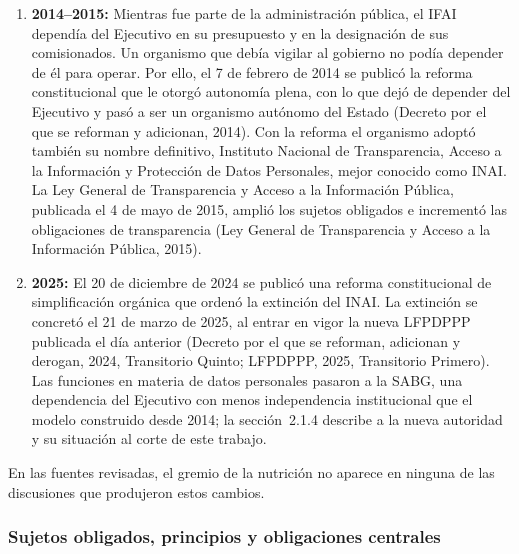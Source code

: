 \documentclass[12pt, a4paper]{article}
\begin{document}
\begin{enumerate}[label=\Roman*.]
  \item \textbf{2014--2015:} Mientras fue parte de la administración
  pública, el IFAI dependía del Ejecutivo en su presupuesto y en la
  designación de sus comisionados. Un organismo que debía vigilar al
  gobierno no podía depender de él para operar. Por ello, el
  7 de febrero de 2014 se publicó la reforma constitucional que le
  otorgó autonomía plena, con lo que dejó de depender del Ejecutivo y
  pasó a ser un organismo autónomo del Estado (Decreto
  por el que se reforman y adicionan, 2014). Con la reforma el
  organismo adoptó también su nombre definitivo, Instituto Nacional
  de Transparencia, Acceso a la Información y Protección de Datos
  Personales, mejor conocido como INAI. La Ley General de Transparencia y Acceso a la Información
  Pública, publicada el 4 de mayo de 2015, amplió los sujetos
  obligados e incrementó las obligaciones de transparencia (Ley
  General de Transparencia y Acceso a la Información Pública, 2015).
 
  \item \textbf{2025:} El 20 de diciembre de 2024 se publicó una
  reforma constitucional de simplificación orgánica que ordenó la
  extinción del INAI. La extinción se concretó el 21 de marzo de
  2025, al entrar en vigor la nueva LFPDPPP publicada el día anterior
  (Decreto por el que se reforman, adicionan y derogan, 2024, Transitorio Quinto; LFPDPPP, 2025, Transitorio Primero). Las funciones en
  materia de datos personales pasaron a la SABG,
  una dependencia del Ejecutivo con menos
  independencia institucional que el modelo construido desde 2014;
  la sección~2.1.4 describe a la nueva autoridad y su situación al
  corte de este trabajo.
 
\end{enumerate}
 
En las fuentes revisadas, el gremio de la nutrición no aparece en
ninguna de las discusiones que produjeron estos cambios.
 
\subsubsection{Sujetos obligados, principios y obligaciones centrales}
 
\end{document}

